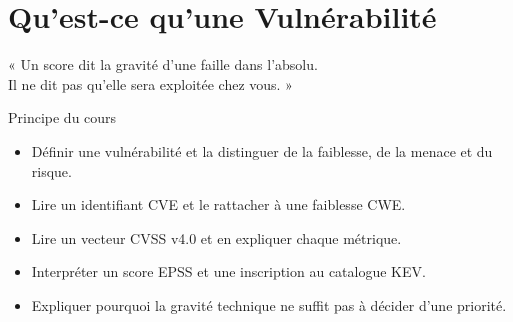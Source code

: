 
\chapter{Qu'est-ce qu'une Vulnérabilité}
\label{chap:vulnerabilite}

\epigraph{%
    « Un score dit la gravité d'une faille dans l'absolu.\\
    Il ne dit pas qu'elle sera exploitée chez vous. »%
}{Principe du cours}


\begin{boxobjectifs}
\begin{itemize}
    \item Définir une vulnérabilité et la distinguer de la faiblesse, de la
          menace et du risque.
    \item Lire un identifiant CVE et le rattacher à une faiblesse CWE.
    \item Lire un vecteur CVSS v4.0 et en expliquer chaque métrique.
    \item Interpréter un score EPSS et une inscription au catalogue KEV.
    \item Expliquer pourquoi la gravité technique ne suffit pas à décider
          d'une priorité.
\end{itemize}
\end{boxobjectifs}

\bigskip

